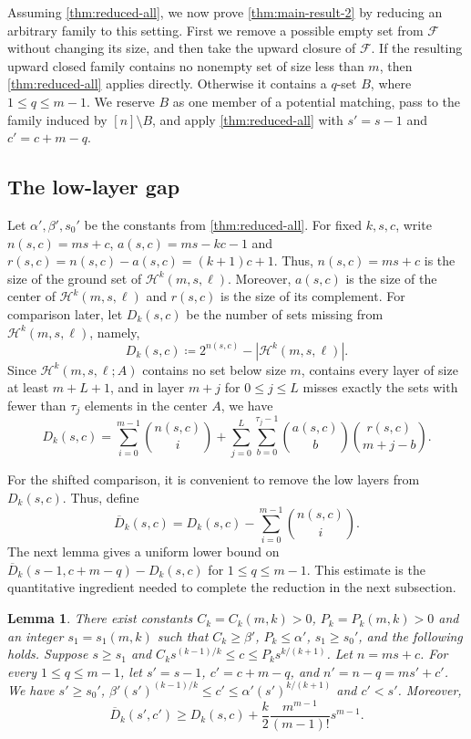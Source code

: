 \documentclass[10pt,a4paper]{article}
\numberwithin{equation}{section}
\newtheorem{lemma}[lemma]{Lemma}
\theoremstyle{definition}
\newcommand{\F}{\mathcal F}
\begin{document}
Assuming \cref{thm:reduced-all}, we now prove \cref{thm:main-result-2} by reducing an arbitrary family to this setting.
First we remove a possible empty set from $\F$ without changing its size, and then take the upward closure of $\F$.
If the resulting upward closed family contains no nonempty set of size less than $m$, then \cref{thm:reduced-all} applies directly.
Otherwise it contains a $q$-set $B$, where $1\le q\le m-1$.
We reserve $B$ as one member of a potential matching, pass to the family induced by $[n]\setminus B$, and apply \cref{thm:reduced-all} with $s'=s-1$ and $c'=c+m-q$.

\subsection{The low-layer gap}

Let $\alpha',\beta',s_0'$ be the constants from \cref{thm:reduced-all}.
For fixed $k,s,c$, write $n(s,c)=ms+c$, $a(s,c)=ms-kc-1$ and $r(s,c)=n(s,c)-a(s,c)=(k+1)c+1$.
Thus, $n(s,c)=ms+c$ is the size of the ground set of $\mathcal H^k(m,s,\ell)$.
Moreover, $a(s,c)$ is the size of the center of $\mathcal H^k(m,s,\ell)$ and $r(s,c)$ is the size of its complement.
For comparison later, let $D_k(s,c)$ be the number of sets missing from $\mathcal H^k(m,s,\ell)$, namely,
\[
        D_k(s,c)\coloneqq 2^{n(s,c)}-|\mathcal H^k(m,s,\ell)|.
\]
Since $\mathcal H^k(m,s,\ell;A)$ contains no set below size $m$,
contains every layer of size at least $m+L+1$, and in layer $m+j$
for $0\le j\le L$ misses exactly the sets with fewer than $\tau_j$
elements in the center $A$, we have
\[
        D_k(s,c)=
        \sum_{i=0}^{m-1}\binom{n(s,c)}{i}
        +
        \sum_{j=0}^L\sum_{b=0}^{\tau_j-1}
        \binom{a(s,c)}{b}\binom{r(s,c)}{m+j-b}.
\]

For the shifted comparison, it is convenient to remove the low layers from $D_k(s,c)$.
Thus, define
\[
        \overline{D}_k(s,c)=
        D_k(s,c)-\sum_{i=0}^{m-1}\binom{n(s,c)}{i}.
\]
The next lemma gives a uniform lower bound on
$\overline{D}_k(s-1,c+m-q)-D_k(s,c)$ for $1\le q\le m-1$.
This estimate is the quantitative ingredient needed to complete the reduction in the next subsection.

\begin{lemma}\label{lem:main-low-layer-gap}
        There exist constants $C_k=C_k(m,k)>0$, $P_k=P_k(m,k)>0$ and an integer $s_1=s_1(m,k)$ such that $C_k\ge \beta'$, $P_k\le \alpha'$, $s_1\ge s_0'$, and the following holds.
        Suppose $s\ge s_1$ and $C_k s^{(k-1)/k}\le c\le P_k s^{k/(k+1)}$.
        Let $n=ms+c$.
        For every $1\le q\le m-1$, let $s'=s-1$, $c'=c+m-q$, and $n'=n-q=ms'+c'$.
        We have $s'\ge s_0'$, $\beta'(s')^{(k-1)/k}\le c'\le \alpha'(s')^{k/(k+1)}$ and $c'<s'$.
        Moreover,
        \[
                \overline{D}_k(s',c')
                \ge
                D_k(s,c)+\frac{k}{2}\frac{m^{m-1}}{(m-1)!}s^{m-1}.
        \]
\end{lemma}
\end{document}
